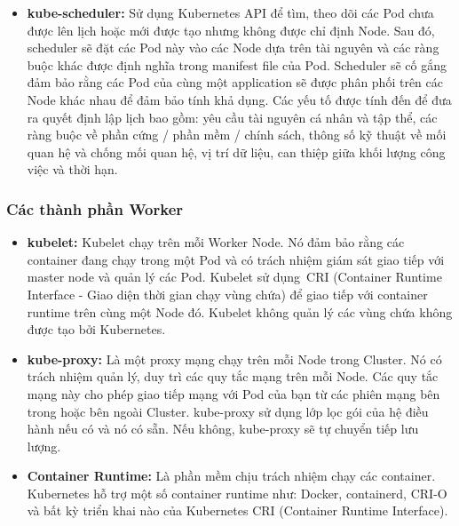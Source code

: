 \documentclass[12pt,a4paper]{report}
\begin{document}
\begin{itemize}
	\item \textbf{kube-scheduler:}
	\smallskip
	\subitem
	Sử dụng Kubernetes API để tìm, theo dõi các Pod chưa được lên lịch hoặc mới được tạo nhưng không được chỉ định Node. Sau đó, scheduler sẽ đặt các Pod này vào các Node dựa trên tài nguyên và các ràng buộc khác được định nghĩa trong manifest file của Pod. Scheduler sẽ cố gắng đảm bảo rằng các Pod của cùng một application sẽ được phân phối trên các Node khác nhau để đảm bảo tính khả dụng.
	\smallskip
	\subitem Các yếu tố được tính đến để đưa ra quyết định lập lịch bao gồm: yêu cầu tài nguyên cá nhân và tập thể, các ràng buộc về phần cứng / phần mềm / chính sách, thông số kỹ thuật về mối quan hệ và chống mối quan hệ, vị trí dữ liệu, can thiệp giữa khối lượng công việc và thời hạn.
	\end{itemize}


	\subsubsection{Các thành phần Worker}
	\smallskip
	\hspace{1cm}{Có nhiệm vụ xử lý khối lượng công việc của application trong cluster, duy trì các nhóm đang chạy và cung cấp môi trường runtime cho Kubernetes. Worker sẽ bao gồm 3 thành phần chính sau:}
	\begin{itemize}
		\item \textbf{kubelet:}
		\smallskip
		\subitem
		Kubelet chạy trên mỗi Worker Node. Nó đảm bảo rằng các container đang chạy trong một Pod và có trách nhiệm giám sát giao tiếp với master node và quản lý các Pod. Kubelet sử dụng CRI (Container Runtime Interface - Giao diện thời gian chạy vùng chứa) để giao tiếp với container runtime trên cùng một Node đó. Kubelet không quản lý các vùng chứa không được tạo bởi Kubernetes.
		
		\item \textbf{kube-proxy:}
		\smallskip
		\subitem
		Là một proxy mạng chạy trên mỗi Node trong Cluster. Nó có trách nhiệm quản lý, duy trì các quy tắc mạng trên mỗi Node. Các quy tắc mạng này cho phép giao tiếp mạng với Pod của bạn từ các phiên mạng bên trong hoặc bên ngoài Cluster. kube-proxy sử dụng lớp lọc gói của hệ điều hành nếu có và nó có sẵn. Nếu không, kube-proxy sẽ tự chuyển tiếp lưu lượng.
		
		\item \textbf{Container Runtime:}
		\smallskip
		\subitem
		Là phần mềm chịu trách nhiệm chạy các container. Kubernetes hỗ trợ một số container runtime như: Docker, containerd, CRI-O và bất kỳ triển khai nào của Kubernetes CRI (Container Runtime Interface).
	\end{itemize}
	
\end{document}
